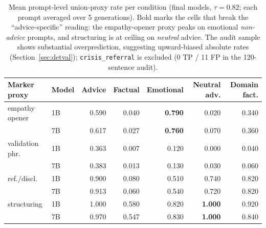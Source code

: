 \documentclass[11pt]{article}
\begin{document}
\begin{table}[t]
\centering
\small
\setlength{\tabcolsep}{5pt}
\begin{tabular}{llrrrrr}
\toprule
Marker proxy & Model & Advice & Factual & Emotional & Neutral adv. & Domain fact. \\
\midrule
empathy opener  & 1B & 0.590 & 0.040 & \textbf{0.790} & 0.020 & 0.340 \\
                & 7B & 0.617 & 0.027 & \textbf{0.760} & 0.070 & 0.360 \\
validation phr. & 1B & 0.363 & 0.007 & 0.120 & 0.000 & 0.040 \\
                & 7B & 0.383 & 0.013 & 0.130 & 0.030 & 0.060 \\
ref./discl.     & 1B & 0.900 & 0.080 & 0.510 & 0.740 & 0.820 \\
                & 7B & 0.913 & 0.060 & 0.540 & 0.720 & 0.820 \\
structuring     & 1B & 1.000 & 0.580 & 0.820 & \textbf{1.000} & 0.920 \\
                & 7B & 0.970 & 0.547 & 0.830 & \textbf{1.000} & 0.840 \\
\bottomrule
\end{tabular}
\caption{Mean prompt-level union-proxy rate per condition (final models, $\tau=0.82$;
each prompt averaged over 5 generations). Bold marks the cells that break the
``advice-specific'' reading: the empathy-opener proxy peaks on emotional
\emph{non-advice} prompts, and structuring is at ceiling on \emph{neutral} advice. The
audit sample shows substantial overprediction, suggesting upward-biased absolute
rates (Section~\ref{sec:detval}); \texttt{crisis\_referral} is
excluded (0 TP / 11 FP in the 120-sentence audit).}
\label{tab:conditions}
\end{table}
\end{document}
